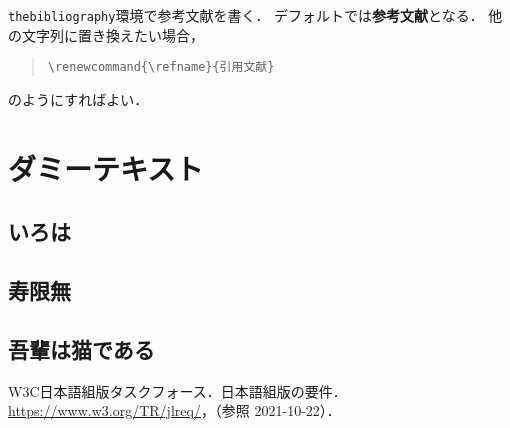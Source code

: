 \documentclass[uplatex, dvipdfmx, fonts=default]{acproceedings}
\begin{document}
\texttt{thebibliography}環境で参考文献を書く．
デフォルトでは\textbf{参考文献}となる．
他の文字列に置き換えたい場合，
\begin{quote}
	\verb|\renewcommand{\refname}{引用文献}|
\end{quote}
のようにすればよい．

\section{ダミーテキスト}

\subsection{いろは}


\subsection{寿限無}


\subsection{吾輩は猫である}


\begin{thebibliography}{9}
	\small
	W3C日本語組版タスクフォース．日本語組版の要件．
	\url{https://www.w3.org/TR/jlreq/}，（参照 2021-10-22）．
\end{thebibliography}
\end{document}
